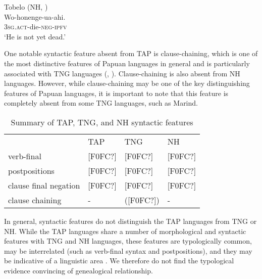 \ea%
Tobelo (NH, \citet{Holton2003})\\
\gll  Wo-honenge-ua-ahi. \\
 \textsc{3sg.act}-die-\textsc{neg-ipfv}  \\
\glt `He is not yet dead.'

\z




One notable syntactic feature absent from TAP is clause-chaining, which is one of the most distinctive features of Papuan languages in general and is particularly associated with TNG languages (\citet[175]{Foley1986}, \citet{Roberts1997}). Clause-chaining is also absent from NH languages. However, while clause-chaining may be one of the key distinguishing features of Papuan languages, it is important to note that this feature is completely absent from some TNG languages, such as Marind.




\begin{table}\centering


\begin{tabular}{llll}& TAP & TNG & NH \\
verb-final& [F0FC?] & [F0FC?] & [F0FC?] \\
postpositions& [F0FC?] & [F0FC?] & [F0FC?] \\
clause final negation& [F0FC?] & [F0FC?] & [F0FC?] \\
clause chaining& - & ([F0FC?]) & - \\

\end{tabular}

\caption{Summary of TAP, TNG, and NH syntactic features}\end{table}
In general, syntactic features do not distinguish the TAP languages from TNG or NH. While the TAP languages share a number of morphological and syntactic features with TNG and NH languages, these features are typologically common, may be interrelated (such as verb-final syntax and postpositions), and they may be indicative of a linguistic area \citep{KlamerEtAl2008}. We therefore do not find the typological evidence convincing of genealogical relationship.

